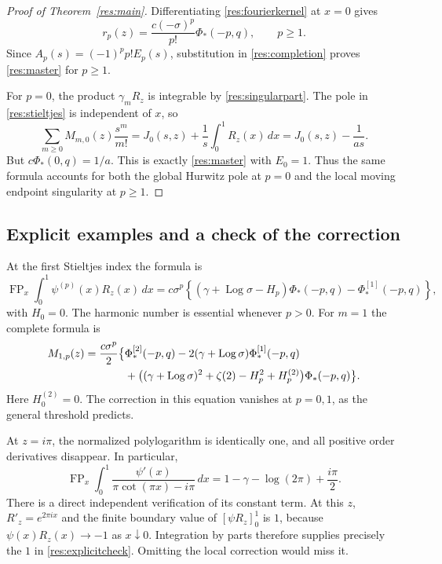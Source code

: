 \documentclass[11pt,a4paper]{article}
\numberwithin{equation}{section}
\theoremstyle{definition}
\theoremstyle{remark}
\DeclareMathOperator{\Log}{Log}
\begin{document}
\begin{proof}[Proof of Theorem~\ref{res:main}]
Differentiating \eqref{res:fourierkernel} at $x=0$ gives
\begin{equation}\label{res:rj}
 r_p(z)=\frac{c(-\sigma)^p}{p!}\Phi_*(-p,q),\qquad p\ge1.
\end{equation}
Since $A_p(s)=(-1)^pp!E_p(s)$, substitution in
\eqref{res:completion} proves \eqref{res:master} for $p\ge1$.

For $p=0$, the product $\gamma_m R_z$ is integrable by
\eqref{res:singularpart}. The pole in \eqref{res:stieltjes} is
independent of $x$, so
\[
 \sum_{m\ge0}M_{m,0}(z)\frac{s^m}{m!}
       =J_0(s,z)+\frac1s\int_0^1R_z(x)\,dx
       =J_0(s,z)-\frac1{as}.
\]
But $c\Phi_*(0,q)=1/a$. This is exactly
\eqref{res:master} with $E_0=1$. Thus the same formula accounts
for both the global Hurwitz pole at $p=0$ and the local moving
endpoint singularity at $p\ge1$.
\end{proof}

\subsection{Explicit examples and a check of the correction}

At the first Stieltjes index the formula is
\begin{equation}\label{res:polygamma}
 \operatorname{FP}_x\int_0^1\psi^{(p)}(x)R_z(x)\,dx
  =c\sigma^p\left\{(\gamma+\Log\sigma-H_p)\Phi_*(-p,q)
                                      -\Phi_*^{[1]}(-p,q)\right\},
\end{equation}
with $H_0=0$. The harmonic number is essential whenever $p>0$.
For $m=1$ the complete formula is
\begin{align}\label{res:gamma1}
 M_{1,p}(z)=\frac{c\sigma^p}{2}\bigl\{
  &\Phi_*^{[2]}(-p,q)-2(\gamma+\Log\sigma)\Phi_*^{[1]}(-p,q)\notag\\
  &+\bigl((\gamma+\Log\sigma)^2+\zeta(2)
                      -H_p^2+H_p^{(2)}\bigr)\Phi_*(-p,q)\bigr\}.
\end{align}
Here $H_0^{(2)}=0$. The correction in this equation vanishes at
$p=0,1$, as the general threshold predicts.

At $z=i\pi$, the normalized polylogarithm is identically one,
and all positive order derivatives disappear. In particular,
\begin{equation}\label{res:explicitcheck}
 \operatorname{FP}_x\int_0^1
       \frac{\psi'(x)}{\pi\cot(\pi x)-i\pi}\,dx
       =1-\gamma-\log(2\pi)+\frac{i\pi}{2}.
\end{equation}
There is a direct independent verification of its constant term.
At this $z$, $R'_z=e^{2\pi ix}$ and the finite boundary value of
$[\psi R_z]_0^1$ is $1$, because $\psi(x)R_z(x)\to-1$ as
$x\downarrow0$. Integration by parts therefore supplies precisely
the $1$ in \eqref{res:explicitcheck}. Omitting the local correction
would miss it.
\end{document}
